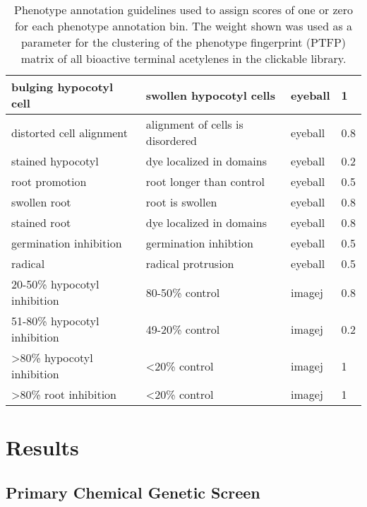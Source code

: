 \begin{table}
\begin{tabular}{|l|l|l|l|}
    bulging hypocotyl cell         & swollen hypocotyl cells          & eyeball   & 1      \\ \hline
    distorted cell alignment       & alignment of cells is disordered & eyeball   & 0.8    \\ \hline
    stained hypocotyl              & dye localized in domains         & eyeball & 0.2 \\ \hline
    root promotion                 & root longer than control         & eyeball & 0.5 \\ \hline
    swollen root                   & root is swollen                  & eyeball & 0.8 \\ \hline
    stained root                   & dye localized in domains         & eyeball  & 0.8 \\ \hline
    germination inhibition         & germination inhibtion            & eyeball & 0.5 \\ \hline
    radical                        & radical protrusion               & eyeball & 0.5 \\ \hline
    20-50{\%} hypocotyl inhibition & 80-50{\%} control                & imagej  & 0.8 \\ \hline
    51-80{\%} hypocotyl inhibition & 49-20{\%} control                & imagej  & 0.2 \\ \hline
    \textgreater 80{\%} hypocotyl inhibition & \textless 20{\%} control                 & imagej  & 1 \\ \hline
    \textgreater 80{\%} root inhibition      & \textless 20{\%} control                 & imagej  & 1 \\ \hline
   \end{tabular}
    \caption {Phenotype annotation guidelines used to assign scores of one or zero for each phenotype annotation bin. The weight shown was used as a parameter for the clustering of the phenotype fingerprint (PTFP) matrix of all bioactive terminal acetylenes in the clickable library. }
    \label{table:PhenotypeAnnotationGuidelines}
\end{table}

\clearpage

\section{Results}

\subsection{Primary Chemical Genetic Screen}

